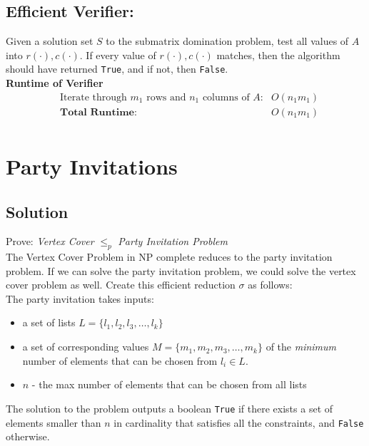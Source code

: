 \documentclass[11pt]{article}
\begin{document}
\subsection{Efficient Verifier:}
Given a solution set $S$ to the submatrix domination problem, test all values of $A$ into $r(\cdot),c(\cdot)$. If every value of $r(\cdot),c(\cdot)$ matches, then the algorithm should have returned \texttt{True}, and if not, then \texttt{False}. \\

\textbf{Runtime of Verifier }
\begin{align*}
&\text{Iterate through $m_1$ rows and $n_1$ columns of $A$:} &O(n_1m_1)\\
&\textbf{Total Runtime: } &O(n_1m_1)\\
\end{align*}

\lobsectionbreak

\section{Party Invitations}

\subsection{Solution}

\lobwatermark

Prove: \textit{Vertex Cover} $\leq_p$ \textit{Party Invitation Problem}\\

The Vertex Cover Problem in NP complete reduces to the party invitation problem. If we can solve the party invitation problem, we could solve the vertex cover problem as well. Create this efficient reduction $\sigma$ as follows:  \\

The party invitation takes inputs:
\begin{itemize}
\item a set of lists $L = \{l_1,l_2,l_3, \ldots, l_{k}\}$
\item a set of corresponding values $M = \{m_1, m_2, m_3, \ldots, m_k\}$ of the \textit{minimum} number of elements that can be chosen from $l_i \in L$.
\item $n$ - the max number of elements that can be chosen from all lists
\end{itemize}

The solution to the problem outputs a boolean \texttt{True} if there exists a set of elements smaller than $n$ in cardinality  that satisfies all the constraints, and \texttt{False} otherwise.\\
\end{document}

